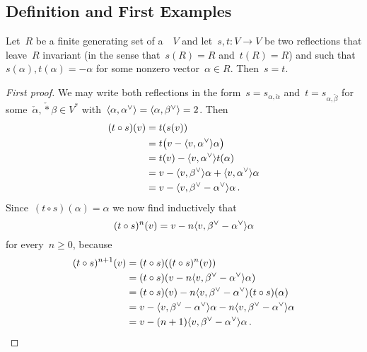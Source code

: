 \subsection{Definition and First Examples}


\begin{lemma}
  \label{uniqueness of reflections}
  Let~$R$ be a finite generating set of a~{\vectorspace{$\kf$}}~$V$ and let~$s, t \colon V \to V$ be two reflections that leave~$R$ invariant (in the sense that~$s(R) = R$ and~$t(R) = R$) and such that~$s(\alpha), t(\alpha) = -\alpha$ for some nonzero vector~$\alpha \in R$.
  Then~$s = t$.
\end{lemma}


\begin{proof}[First proof]
  We may write both reflections in the form~$s = s_{\alpha, \check{\alpha}}$ and~$t = s_{\alpha, \check{\beta}}$ for some~$\check{\alpha}, \check*{\beta} \in V^*$ with~$\pair{\alpha, \check{\alpha}} = \pair{\alpha, \check{\beta}} = 2$.
  Then
  \begin{align*}
    (t \circ s)(v)
    &=
    t(s(v))
    \\
    &=
    t\bigl( v - \pair{v, \check{\alpha}} \alpha \bigr)
    \\
    &=
    t(v) - \pair{v, \check{\alpha}} t(\alpha)
    \\
    &=
    v - \pair{v, \check{\beta}} \alpha + \pair{v, \check{\alpha}} \alpha
    \\
    &=
    v - \pair{v, \check{\beta} - \check{\alpha}} \alpha \,.
  \end{align*}
  Since~$(t \circ s)(\alpha) = \alpha$ we now find inductively that
  \begin{equation}
    \label{inductive reflection formula}
    (t \circ s)^n(v)
    =
    v - n \pair{v, \check{\beta} - \check{\alpha}} \alpha
  \end{equation}
  for every~$n \geq 0$, because
  \begin{align*}
    (t \circ s)^{n+1}(v)
    &=
    (t \circ s)((t \circ s)^n(v))
    \\
    &=
    (t \circ s)(v - n \pair{v, \check{\beta} - \check{\alpha}} \alpha)
    \\
    &=
    (t \circ s)(v) - n \pair{v, \check{\beta} - \check{\alpha}} (t \circ s)(\alpha)
    \\
    &=
    v - \pair{v, \check{\beta} - \check{\alpha}} \alpha - n \pair{v, \check{\beta} - \check{\alpha}} \alpha
    \\
    &=
    v - (n+1) \pair{v, \check{\beta} - \check{\alpha}} \alpha \,.
  \end{align*}


\end{proof}
